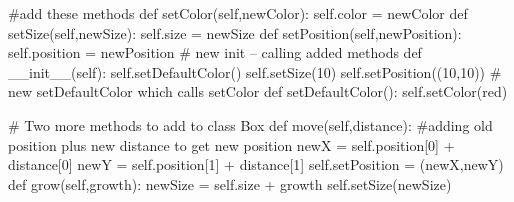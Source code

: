 \begin{exercises}
\begin{ex}
\begin{example}
#add these methods
  def setColor(self,newColor):
    self.color = newColor
  def setSize(self,newSize):
    self.size = newSize
  def setPosition(self,newPosition):
    self.position = newPosition
# new init -- calling added methods
  def \_\_init\_\_(self):
    self.setDefaultColor()
    self.setSize(10)
    self.setPosition((10,10))
# new setDefaultColor which calls setColor
  def setDefaultColor():
    self.setColor(red)
\end{example}
\end{ex}

\begin{ex} %
\begin{example}
# Two more methods to add to class Box
def move(self,distance):
  #adding old position plus new distance to get new position
  newX = self.position[0] + distance[0]
  newY = self.position[1] + distance[1]
  self.setPosition = (newX,newY)
def grow(self,growth):
  newSize = self.size + growth
  self.setSize(newSize)
\end{example}
\end{ex}
\end{exercises}
